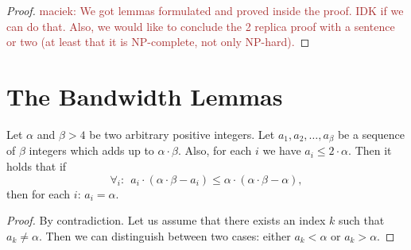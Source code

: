 \documentclass[9pt]{sigcomm-alternate}
\newcommand{\maciek}[1]{\textcolor{brown}{maciek: #1}}
\newcommand{\clauses}{\alpha}
\newcommand{\variables}{\beta}
\begin{document}
\begin{appendix}
\begin{proof}
\maciek{We got lemmas formulated and proved inside the proof. IDK if we can do that. Also, we would like to conclude the 2 replica proof with a sentence or two (at least that it is NP-complete, not only NP-hard).}
\end{proof}

%
%
%
%
%
%
\section{The Bandwidth Lemmas}


\begin{lemma}\label{lem:bandwidth-lemma}
  Let $\clauses$ and $\variables > 4$ be two arbitrary positive integers. Let $a_1, a_2, \ldots,
  a_{\variables}$ be a sequence of $\variables$ integers which adds up to $\clauses \cdot \variables$. Also, for
  each $i$ we have $a_i \leq 2 \cdot \clauses$. Then it holds that if
  $$ \forall_i:~~ a_i \cdot (\clauses \cdot \variables - a_i) \leq \clauses \cdot (\clauses \cdot \variables -
  \clauses), $$
\noindent  then for each $i$: $a_i = \clauses$.
\end{lemma}
\begin{proof}
  By contradiction. Let us assume 
that there exists an index $k$ such that
$a_k \neq \clauses$. Then we can distinguish between two cases:
either $a_k<\clauses$ or
$a_k>\clauses$.


\end{proof}
\end{appendix}
\end{document}
